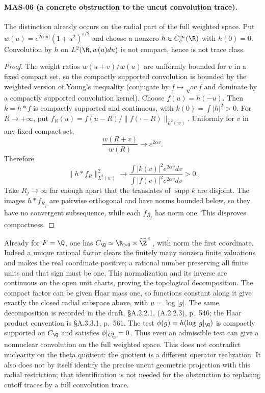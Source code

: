 \paragraph{MAS-06 (a concrete obstruction to the uncut convolution trace).}
The distinction already occurs on the radial part of the full weighted space. Put
$w(u)=e^{2\alpha|u|}(1+u^2)^{s/2}$ and choose a nonzero $h\in C_c^\infty(\R)$ with $h(0)=0$. Convolution by $h$ on $L^2(\R,w(u)du)$ is not compact, hence is not trace class.
\begin{proof}
The weight ratios $w(u+v)/w(u)$ are uniformly bounded for $v$ in a fixed compact set, so the compactly supported convolution is bounded by the weighted version of Young's inequality (conjugate by $f\mapsto\sqrt w f$ and dominate by a compactly supported convolution kernel).
Choose $f(u)=\overline{h(-u)}$. Then $k=h*f$ is compactly supported and continuous, with $k(0)=\int|h|^2>0$. For $R\to+\infty$, put $f_R(u)=f(u-R)/\|f(\cdot-R)\|_{L^2(w)}$. Uniformly for $v$ in any fixed compact set,
\[
 \frac{w(R+v)}{w(R)}\longrightarrow e^{2\alpha v}.
\]
Therefore
\[
 \|h*f_R\|_{L^2(w)}^2\longrightarrow
 \frac{\int|k(v)|^2e^{2\alpha v}dv}{\int|f(v)|^2e^{2\alpha v}dv}>0.
\]
Take $R_j\to\infty$ far enough apart that the translates of $\operatorname{supp}k$ are disjoint. The images $h*f_{R_j}$ are pairwise orthogonal and have norms bounded below, so they have no convergent subsequence, while each $f_{R_j}$ has norm one. This disproves compactness.
\end{proof}
Already for $F=\Q$, one has $C_\Q\simeq\R_{>0}\times\widehat\Z^\times$, with norm the first coordinate. Indeed a unique rational factor clears the finitely many nonzero finite valuations and makes the real coordinate positive; a rational number preserving all finite units and that sign must be one. This normalization and its inverse are continuous on the open unit charts, proving the topological decomposition. The compact factor can be given Haar mass one, so functions constant along it give exactly the closed radial subspace above, with $u=\log|g|$. The same decomposition is recorded in the draft, \S A.2.2.1, (A.2.2.3), p.~546; the Haar product convention is \S A.3.3.1, p.~561. The test $\phi(g)=h(\log|g|_\Q)$ is compactly supported on $C_\Q$ and satisfies $\phi|_{C_\Q^1}=0$. Thus even an admissible test can give a nonnuclear convolution on the full weighted space. This does not contradict nuclearity on the theta quotient: the quotient is a different operator realization. It also does not by itself identify the precise uncut geometric projection with this radial restriction; that identification is not needed for the obstruction to replacing cutoff traces by a full convolution trace.

